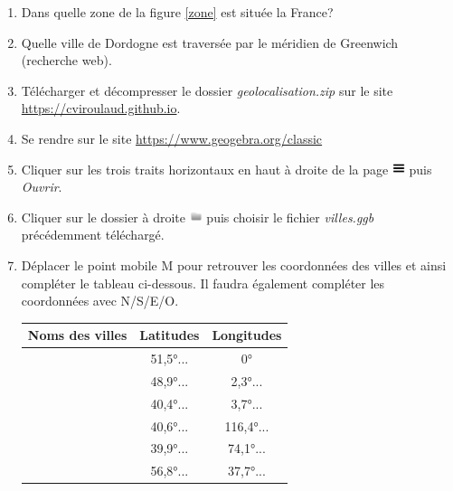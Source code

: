 \documentclass[a4paper,11pt]{article}
\begin{document}
\begin{activite}
    \begin{enumerate}
        \item Dans quelle zone de la figure \ref{zone} est située la France?
        \item Quelle ville de Dordogne est traversée par le méridien de Greenwich (recherche web).
        \item Télécharger et décompresser le dossier \emph{geolocalisation.zip} sur le site \url{https://cviroulaud.github.io}.
        \item Se rendre sur le site \url{https://www.geogebra.org/classic}
        \item Cliquer sur les trois traits horizontaux en haut à droite de la page \includegraphics[height=1em]{ressources/hamburger.png} puis \emph{Ouvrir}.
        \item Cliquer sur le dossier à droite \includegraphics[height=1em]{ressources/folder.png} puis choisir le fichier \emph{villes.ggb} précédemment téléchargé.
        \item Déplacer le point mobile M pour retrouver les coordonnées des villes et ainsi compléter le tableau ci-dessous. Il faudra également compléter les coordonnées avec N/S/E/O.
              \begin{center}
                  \begin{tabular}{|*{3}{c|}}
                      \hline
                      Noms des villes & Latitudes & Longitudes \\
                      \hline
                                      & 51,5°...  & 0°         \\
                      \hline
                                      & 48,9°...  & 2,3°...    \\
                      \hline
                                      & 40,4°...  & 3,7°...    \\
                      \hline
                                      & 40,6°...  & 116,4°...  \\
                      \hline
                                      & 39,9°...  & 74,1°...   \\
                      \hline
                                      & 56,8°...  & 37,7°...   \\
                      \hline
                  \end{tabular}
              \end{center}
    \end{enumerate}
\end{activite}
\end{document}
